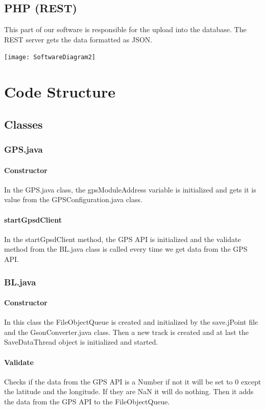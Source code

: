 \subsection{PHP (REST)}
This part of our software is responsible for the upload into the database. The REST server gets the data formatted as JSON.
\begin{center}
\texttt{[image: SoftwareDiagram2]}
\end{center} 
\section{Code Structure}
\subsection{Classes}
\subsubsection{GPS.java}
\paragraph{Constructor}
In the GPS.java class, the gpsModuleAddress variable is initialized and gets it is value from the GPSConfiguration.java class.
\paragraph{startGpsdClient}
In the startGpsdClient method, the GPS API is initialized and the validate method from the BL.java class is called every time we get data from the GPS API.
\subsubsection{BL.java}
\paragraph{Constructor}
In this class the FileObjectQueue is created and initialized by the save.jPoint file and the GsonConverter.java class. 
Then a new track is created and at last the SaveDataThread object is initialized and started.
\paragraph{Validate}
Checks if the data from the GPS API is a Number if not it will be set to 0 except the latitude and the longitude. If they are NaN it will do nothing. 
Then it adds the data from the GPS API to the FileObjectQueue.
